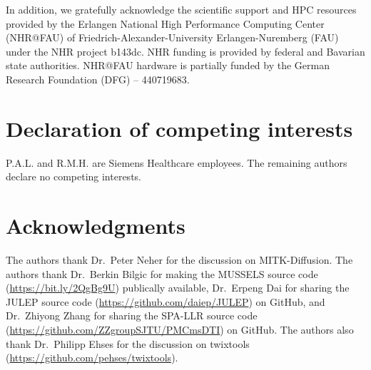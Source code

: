 \documentclass[preprint,12pt,authoryear,review]{elsarticle}
\begin{document}
    In addition, we gratefully acknowledge the scientific support and HPC resources
    provided by the Erlangen National High Performance Computing Center (NHR@FAU)
    of Friedrich-Alexander-University Erlangen-Nuremberg (FAU)
    under the NHR project b143dc.
    NHR funding is provided by federal and Bavarian state authorities.
    NHR@FAU hardware is partially funded by the German Research Foundation (DFG) -- 440719683.

    \section*{Declaration of competing interests}

    P.A.L. and R.M.H. are Siemens Healthcare employees.
    The remaining authors declare no competing interests.

    \section*{Acknowledgments}

    The authors thank Dr.~Peter Neher for the discussion on MITK-Diffusion.
    The authors thank
    Dr.~Berkin Bilgic for making the MUSSELS source code
    (\url{https://bit.ly/2QgBg9U}) publically available,
    Dr.~Erpeng Dai for sharing the JULEP source code
    (\url{https://github.com/daiep/JULEP}) on GitHub,
    and Dr.~Zhiyong Zhang for sharing the SPA-LLR source code
    (\url{https://github.com/ZZgroupSJTU/PMCmsDTI}) on GitHub.
    The authors also thank Dr.~Philipp Ehses for the discussion on
    twixtools (\url{https://github.com/pehses/twixtools}).

    
\end{document}

